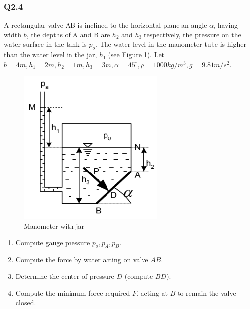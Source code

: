 \subsubsection{Q2.4}
A rectangular valve AB is inclined to the horizontal plane an angle $\alpha$, having width $ b $, the depths of A and B are $ h_2 $ and $ h_3 $ respectively, the pressure on the water surface in the tank is $ p_o $. The water level in the manometer tube is higher than the water level in the jar, $ h_1 $ (see Figure \ref{fig:4}).
Let $ b = 4\unit{m}, h_1 = 2 \unit{m}, h_2 = 1 \unit{m}, h_3 = 3 \unit{m},  \alpha= 45^\circ,\rho=1000\unit{kg/m^3},g=9.81\unit{m/s^2} $.
\begin{figure}[h]
	\centering
	\includegraphics[width=0.4\linewidth]{"2020-08-15 16.48.02 drive.google.com 0b8dc5aedc2f"}
	\caption{Manometer with jar}
	\label{fig:4}
\end{figure}
\begin{enumerate}
	\item Compute gauge pressure $ p_o, p_A, p_B $.
	\item Compute the force by water acting on valve $ AB $.
	\item Determine the center of pressure $ D $ (compute $ BD $).
	\item Compute the minimum force required $ F $, acting at $ B $ to remain the valve closed.
\end{enumerate}
